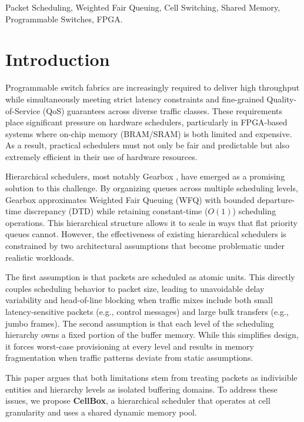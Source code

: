 \documentclass[conference]{IEEEtran}
\begin{document}
\begin{IEEEkeywords}
Packet Scheduling, Weighted Fair Queuing, Cell Switching, Shared Memory, Programmable Switches, FPGA.
\end{IEEEkeywords}

\section{Introduction}
\label{sec:introduction}

Programmable switch fabrics are increasingly required to deliver high throughput while simultaneously meeting strict latency constraints and fine-grained Quality-of-Service (QoS) guarantees across diverse traffic classes. These requirements place significant pressure on hardware schedulers, particularly in FPGA-based systems where on-chip memory (BRAM/SRAM) is both limited and expensive. As a result, practical schedulers must not only be fair and predictable but also extremely efficient in their use of hardware resources.

Hierarchical schedulers, most notably Gearbox \cite{gearbox}, have emerged as a promising solution to this challenge. By organizing queues across multiple scheduling levels, Gearbox approximates Weighted Fair Queuing (WFQ) with bounded departure-time discrepancy (DTD) while retaining constant-time ($O(1)$) scheduling operations. This hierarchical structure allows it to scale in ways that flat priority queues cannot. However, the effectiveness of existing hierarchical schedulers is constrained by two architectural assumptions that become problematic under realistic workloads.

The first assumption is that packets are scheduled as atomic units. This directly couples scheduling behavior to packet size, leading to unavoidable delay variability and head-of-line blocking when traffic mixes include both small latency-sensitive packets (e.g., control messages) and large bulk transfers (e.g., jumbo frames). The second assumption is that each level of the scheduling hierarchy owns a fixed portion of the buffer memory. While this simplifies design, it forces worst-case provisioning at every level and results in memory fragmentation when traffic patterns deviate from static assumptions.

This paper argues that both limitations stem from treating packets as indivisible entities and hierarchy levels as isolated buffering domains. To address these issues, we propose \textbf{CellBox}, a hierarchical scheduler that operates at cell granularity and uses a shared dynamic memory pool.
\end{document}
